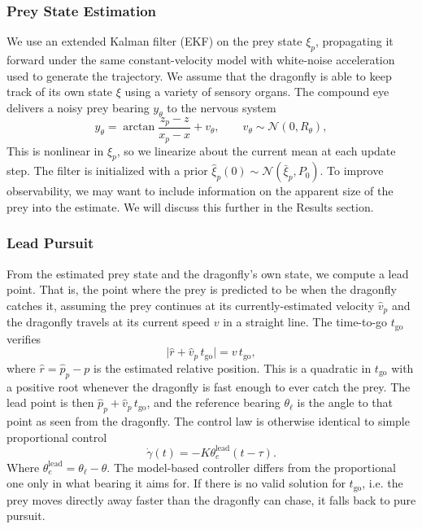\documentclass[12pt]{article}
\begin{document}
\subsubsection{Prey State Estimation}

We use an extended Kalman filter (EKF) on the prey state $\xi_p$,
propagating it forward under the same constant-velocity model
with white-noise acceleration used to generate the trajectory.
We assume that the dragonfly is able to keep track of its own
state $\xi$ using a variety of sensory organs.
The compound eye delivers a noisy prey bearing $y_\theta$ to the nervous system
\begin{equation}
    y_\theta = \arctan{\frac{z_p - z}{x_p - x}} + v_\theta,
    \qquad v_\theta \sim \mathcal{N}(0, R_\theta),
\end{equation}
This is nonlinear in $\xi_p$, so we linearize about the current mean
at each update step. The filter is initialized with a prior
$\hat\xi_p(0) \sim \mathcal{N}(\bar\xi_p, P_0)$.
To improve observability, we may want to include information
on the apparent size of the prey into the estimate. We will discuss this
further in the Results section.

\subsubsection{Lead Pursuit}

From the estimated prey state and the dragonfly's own state, we
compute a lead point. That is, the point where the prey is predicted to be when
the dragonfly catches it, assuming the prey continues at its
currently-estimated velocity $\hat v_p$ and the dragonfly travels at
its current speed $v$ in a straight line. The time-to-go
$t_\text{go}$ verifies
\begin{equation}
    \lvert \hat r + \hat v_p\, t_\text{go} \rvert
    = v \, t_\text{go},
\end{equation}
where $\hat r = \hat p_p - p$ is the estimated relative position.
This is a quadratic in $t_\text{go}$ with a positive root whenever
the dragonfly is fast enough to ever catch the prey. The lead point is then
$\hat p_p + \hat v_p\, t_\text{go}$, and the reference bearing
$\theta_\ell$ is the angle to that point as seen from the dragonfly.
The control law is otherwise identical to simple proportional control
\begin{equation}
    \dot\gamma(t) = -K \theta_e^\text{lead}(t - \tau).
\end{equation}
Where $\theta_e^\text{lead} = \theta_\ell - \theta$.
The model-based controller differs from the proportional one
only in what bearing it aims for.
If there is no valid solution for $t_\text{go}$,
i.e. the prey moves directly away faster than the dragonfly
can chase, it falls back to pure pursuit.
\bigskip
\end{document}
